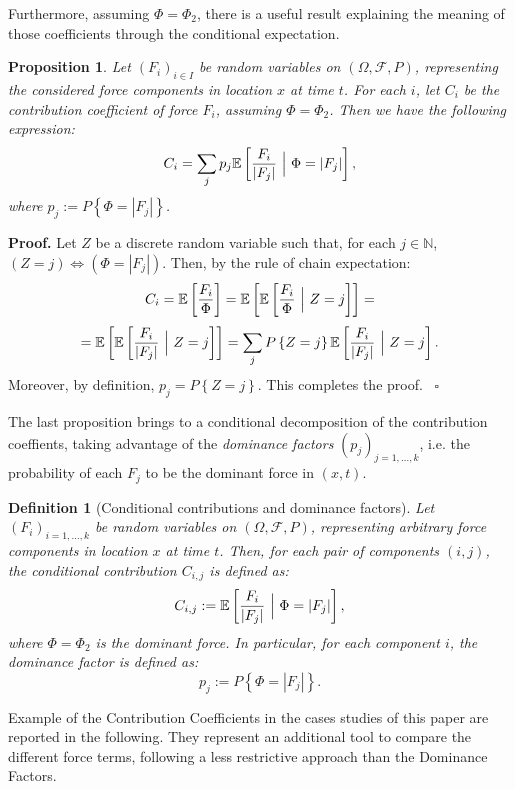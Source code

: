 \documentclass{article}
\newtheorem{definition}[theorem]{Definition}
\newtheorem{proposition}[theorem]{Proposition}
\newenvironment{proof}[1][Proof]{\noindent\textbf{#1.} }{\ $\square$}
\begin{document}
Furthermore, assuming $\Phi=\Phi_2$, there is a useful result explaining the meaning of those coefficients through the conditional expectation.
\begin{proposition}
Let $(F_i)_{i\in I}$ be random variables on $(\Omega, \mathcal F, P)$, representing the considered force components in location $x$ at time $t$. For each $i$, let $C_i$ be the contribution coefficient of force $F_i$, assuming $\Phi=\Phi_2$. Then we have the following expression:
$$C_i=\sum_j p_j \mathbb E\left[\frac{F_i}{|F_j|}\ \Big{|}\ \Phi=|F_j|\right],$$
where $p_j:=P\left\{\Phi=|F_j|\right\}$.
\end{proposition}

\begin{proof}
Let $Z$ be a discrete random variable such that, for each $j\in\mathbb N$, $(Z=j) \Longleftrightarrow (\Phi=|F_j|)$. Then, by the rule of chain expectation:
$$C_i=\mathbb E\left[\frac{F_i}{\Phi}\right]=\mathbb E\left[\mathbb E\left[\frac{F_i}{\Phi}\ \Big{|}\ Z=j\right]\right]=$$
$$=\mathbb E\left[\mathbb E\left[\frac{F_i}{|F_j|}\ \Big{|}\ Z=j\right]\right]=\sum_j P\left\{Z=j\right\} \mathbb E\left[\frac{F_i}{|F_j|}\ \Big{|}\ Z=j\right].$$
Moreover, by definition, $p_j=P\left\{Z=j\right\}$. This completes the proof.
\end{proof}

The last proposition brings to a conditional decomposition of the contribution coeffients, taking advantage of the \emph{dominance factors} $(p_j)_{j=1,\dots, k}$, i.e. the probability of each $F_j$ to be the dominant force in $(x,t)$.

\begin{definition}[Conditional contributions and dominance factors]
Let $(F_i)_{i=1,\dots, k}$ be random variables on $(\Omega, \mathcal F, P)$, representing arbitrary force components in location $x$ at time $t$. Then, for each pair of components $(i,j)$, the conditional contribution $C_{i,j}$ is defined as:
$$C_{i,j}:=\mathbb E\left[\frac{F_i}{|F_j|}\ \Big{|}\ \Phi=|F_j|\right],$$
where $\Phi=\Phi_2$ is the dominant force. In particular, for each component $i$, the dominance factor is defined as:
$$p_j:=P\left\{\Phi=|F_j|\right\}.$$
\end{definition}

Example of the Contribution Coefficients in the cases studies of this paper are reported in the following. They represent an additional tool to compare the different force terms, following a less restrictive approach than the Dominance Factors.
\end{document}
